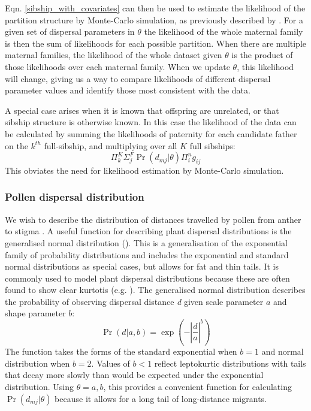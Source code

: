 \documentclass[10pt, a4paper, twocolumn]{article} %
\begin{document}
Eqn. \ref{sibship_with_covariates} can then be used to estimate the likelihood of the partition structure by Monte-Carlo simulation, as previously described by \textcite{ellis2018efficient}.
For a given set of dispersal parameters in $\theta$ the likelihood of the whole maternal family is then the sum of likelihoods for each possible partition. When there are multiple maternal families, the likelihood of the whole dataset given $\theta$ is the product of those likelihoods over each maternal family. When we update $\theta$, this likelihood will change, giving us a way to compare likelihoods of different dispersal parameter values and identify those most consistent with the data.

A special case arises when it is known that offspring are unrelated, or that sibship structure is otherwise known. In this case the likelihood of the data can be calculated by summing the likelihoods of paternity for each candidate father on the $k^{th}$ full-sibship, and multiplying over all $K$ full sibships:
\begin{equation}
    \label{eqn:lik_if_no_structure}
    \Pi_k^K\Sigma_j^F\Pr(d_{mj} | \theta)\Pi_i^n g_{ij}
\end{equation}
This obviates the need for likelihood estimation by Monte-Carlo simulation.

\subsubsection{Pollen dispersal distribution}

We wish to describe the distribution of distances travelled by pollen from anther to stigma \citep{nathan2012dispersal}.
A useful function for describing plant dispersal distributions is the generalised normal distribution (\cite{clark1998trees,Nadarajah2005,kremer2012long}). This is a generalisation of the exponential family of probability distributions and includes the exponential and standard normal distributions as special cases, but allows for fat and thin tails. It is commonly used to model plant dispersal distributions because these are often found to show clear kurtotis (e.g. \cite{austerlitz2004using, robledo2005patterns, klein2008pollen, burczyk2019patterns, field2011importance, ottewell2012pollen}). The generalised normal distribution describes the probability of observing dispersal distance \textit{d} given scale parameter $a$ and shape parameter $b$:
\begin{equation}
\Pr(d|a,b) = \exp{  (-|\frac{d}{a}| ^b) }
\label{eqn:GND}
\end{equation}
The function takes the forms of the standard exponential when $b=1$ and normal distribution when $b=2$. Values of $b<1$ reflect leptokurtic distributions with tails that decay more slowly than would be expected under the exponential distribution. Using $\theta={a,b}$, this provides a convenient function for calculating $\Pr(d_{mj} | \theta)$ because it allows for a long tail of long-distance migrants.
\end{document}

